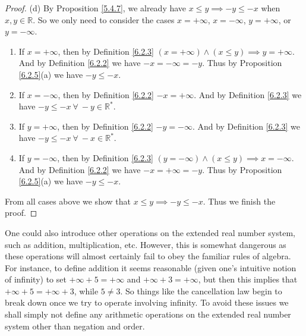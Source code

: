 \begin{proof}{(d)}
By Proposition \ref{5.4.7}, we already have \(x \leq y \implies -y \leq -x\) when \(x, y \in \mathds{R}\).
So we only need to consider the cases \(x = +\infty\), \(x = -\infty\), \(y = +\infty\), or \(y = -\infty\).
\begin{enumerate}[label=(\Roman*)]
    \item If \(x = +\infty\), then by Definition \ref{6.2.3} \((x = +\infty) \land (x \leq y) \implies y = +\infty\).
    And by Definition \ref{6.2.2} we have \(-x = -\infty = -y\).
    Thus by Proposition \ref{6.2.5}(a) we have \(-y \leq -x\).
    \item If \(x = -\infty\), then by Definition \ref{6.2.2} \(-x = +\infty\).
    And by Definition \ref{6.2.3} we have \(-y \leq -x \ \forall\ -y \in \mathds{R}^*\).
    \item If \(y = +\infty\), then by Definition \ref{6.2.2} \(-y = -\infty\).
    And by Definition \ref{6.2.3} we have \(-y \leq -x \ \forall\ -x \in \mathds{R}^*\).
    \item If \(y = -\infty\), then by Definition \ref{6.2.3} \((y = -\infty) \land (x \leq y) \implies x = -\infty\).
    And by Definition \ref{6.2.2} we have \(-x = +\infty = -y\).
    Thus by Proposition \ref{6.2.5}(a) we have \(-y \leq -x\).
\end{enumerate}
From all cases above we show that \(x \leq y \implies -y \leq -x\).
Thus we finish the proof.
\end{proof}

\begin{note}
One could also introduce other operations on the extended real number system, such as addition, multiplication, etc.
However, this is somewhat dangerous as these operations will almost certainly fail to obey the familiar rules of algebra.
For instance, to define addition it seems reasonable (given one’s intuitive notion of infinity) to set \(+\infty + 5 = +\infty\) and \(+\infty + 3 = +\infty\), but then this implies that \(+\infty + 5 = +\infty + 3\), while \(5 \neq 3\).
So things like the cancellation law begin to break down once we try to operate involving infinity.
To avoid these issues we shall simply not define any arithmetic operations on the extended real number system other than negation and order.
\end{note}


